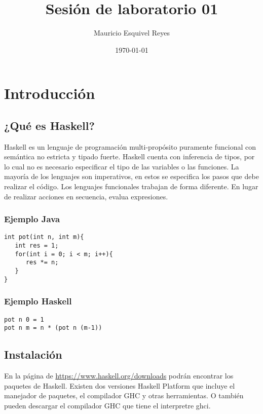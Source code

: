 \documentclass[11pt]{article}
\author{Mauricio Esquivel Reyes}
\date{\today}
\title{Sesión de laboratorio 01}
\begin{document}
\maketitle
\tableofcontents


\section{Introducción}
\label{sec:orgcaf1f15}
\subsection{¿Qué es Haskell?}
\label{sec:org0df14ea}
Haskell es un lenguaje de programación multi-propósito puramente funcional
con semántica no estricta y tipado fuerte.
Haskell cuenta con inferencia de tipos, por lo cual no es necesario especificar
el tipo de las variables o las funciones.
La mayoría de los lenguajes son imperativos, en estos se especifica los
pasos que debe realizar el código. Los lenguajes funcionales trabajan de forma diferente.
En lugar de realizar acciones en secuencia, evalua expresiones.
\subsubsection{Ejemplo Java}
\label{sec:org92df6a3}
\begin{verbatim}
int pot(int n, int m){
   int res = 1;
   for(int i = 0; i < m; i++){
      res *= n;
   }
}
\end{verbatim}
\subsubsection{Ejemplo Haskell}
\label{sec:orgae9227c}
\begin{verbatim}
pot n 0 = 1
pot n m = n * (pot n (m-1)) 
\end{verbatim}
\subsection{Instalación}
\label{sec:org65c9787}
En la página de \url{https://www.haskell.org/downloads} podrán encontrar los 
paquetes de Haskell. Existen dos versiones Haskell Platform que incluye 
el manejador de paquetes, el compilador GHC y otras herramientas.
O también pueden descargar el compilador GHC que tiene el interpretre ghci.
\end{document}
